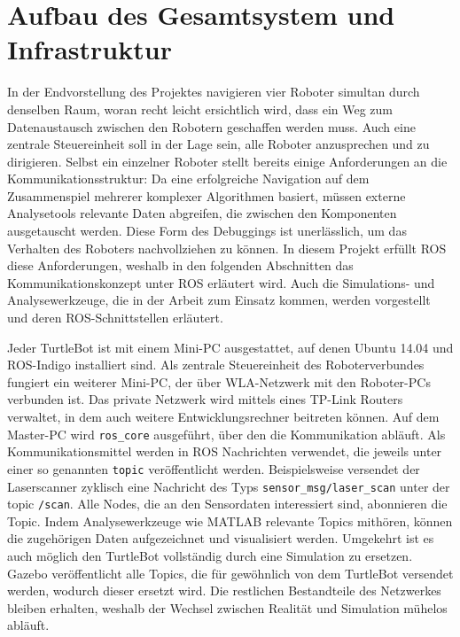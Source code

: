 \chapter{Aufbau des Gesamtsystem und Infrastruktur}
In der Endvorstellung des Projektes navigieren vier Roboter simultan durch denselben Raum, woran recht leicht ersichtlich wird, dass ein Weg zum Datenaustausch zwischen den Robotern geschaffen werden muss. Auch eine zentrale Steuereinheit soll in der Lage sein, alle Roboter anzusprechen und zu dirigieren. Selbst ein einzelner Roboter stellt bereits einige Anforderungen an die Kommunikationsstruktur: Da eine erfolgreiche Navigation auf dem Zusammenspiel mehrerer komplexer Algorithmen basiert, müssen externe Analysetools relevante Daten abgreifen, die zwischen den Komponenten ausgetauscht werden. Diese Form des Debuggings ist unerlässlich, um das Verhalten des Roboters nachvollziehen zu können. In diesem Projekt erfüllt ROS diese Anforderungen, weshalb in den folgenden Abschnitten das Kommunikationskonzept unter ROS erläutert wird. Auch die Simulations- und Analysewerkzeuge, die in der Arbeit zum Einsatz kommen, werden vorgestellt und deren ROS-Schnittstellen erläutert.

Jeder TurtleBot ist mit einem Mini-PC ausgestattet, auf denen Ubuntu 14.04 und ROS-Indigo installiert sind. Als zentrale Steuereinheit des Roboterverbundes fungiert ein weiterer Mini-PC, der über WLA-Netzwerk mit den Roboter-PCs verbunden ist. Das private Netzwerk wird mittels eines TP-Link Routers verwaltet, in dem auch weitere Entwicklungsrechner beitreten können. Auf dem Master-PC wird \lstinline{ros_core}{} ausgeführt, über den die Kommunikation abläuft. Als Kommunikationsmittel werden in ROS Nachrichten verwendet, die jeweils unter einer so genannten \lstinline{topic}{} veröffentlicht werden. Beispielsweise versendet der Laserscanner zyklisch eine Nachricht des Typs \lstinline{sensor_msg/laser_scan}{} unter der topic \lstinline{/scan}{}. Alle Nodes, die an den Sensordaten interessiert sind, abonnieren die Topic. Indem Analysewerkzeuge wie MATLAB relevante Topics mithören, können die zugehörigen Daten aufgezeichnet und visualisiert werden. Umgekehrt ist es auch möglich den TurtleBot vollständig durch eine Simulation zu ersetzen. Gazebo veröffentlicht alle Topics, die für gewöhnlich von dem TurtleBot versendet werden, wodurch dieser ersetzt wird. Die restlichen Bestandteile des Netzwerkes bleiben erhalten, weshalb der Wechsel zwischen Realität und Simulation mühelos abläuft.

